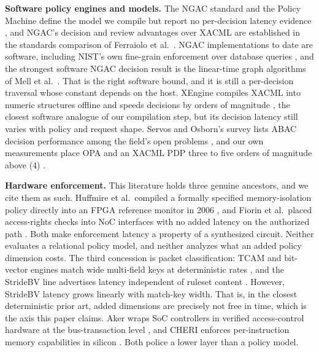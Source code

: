 \documentclass[conference]{IEEEtran}
\begin{document}
\textbf{Software policy engines and models.} The NGAC standard and the Policy Machine define the model we compile but report no per-decision latency evidence \cite{incits565, ferraiolo2011policymachine, hu2014sp800162}, and NGAC's decision and review advantages over XACML are established in the standards comparison of Ferraiolo et al.\ \cite{ferraiolo2016xacml}. NGAC implementations to date are software, including NIST's own fine-grain enforcement over database queries \cite{ferraiolo2017database}, and the strongest software NGAC decision result is the linear-time graph algorithms of Mell et al.\ \cite{mell2017linear}. That is the right software bound, and it is still a per-decision traversal whose constant depends on the host. XEngine compiles XACML into numeric structures offline and speeds decisions by orders of magnitude \cite{liu2011xengine}, the closest software analogue of our compilation step, but its decision latency still varies with policy and request shape. Servos and Osborn's survey lists ABAC decision performance among the field's open problems \cite{servos2017abac}, and our own measurements place OPA and an XACML PDP three to five orders of magnitude above (4) \cite{opa, karim2026tsngac, oasisxacml}.

\textbf{Hardware enforcement.} This literature holds three genuine ancestors, and we cite them as such. Huffmire et al.\ compiled a formally specified memory-isolation policy directly into an FPGA reference monitor in 2006 \cite{huffmire2006policy}, and Fiorin et al.\ placed access-rights checks into NoC interfaces with no added latency on the authorized path \cite{fiorin2008secure}. Both make enforcement latency a property of a synthesized circuit. Neither evaluates a relational policy model, and neither analyzes what an added policy dimension costs. The third concession is packet classification: TCAM and bit-vector engines match wide multi-field keys at deterministic rates \cite{song2005bvtcam}, and the StrideBV line advertises latency independent of ruleset content \cite{ganegedara2014scalable}. However, StrideBV latency grows linearly with match-key width. That is, in the closest deterministic prior art, added dimensions are precisely not free in time, which is the axis this paper claims. Aker wraps SoC controllers in verified access-control hardware at the bus-transaction level \cite{restuccia2021aker}, and CHERI enforces per-instruction memory capabilities in silicon \cite{watson2015cheri}. Both police a lower layer than a policy model.
\end{document}
